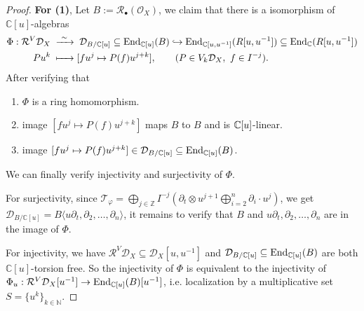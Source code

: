 \begin{proof}
    \mbox{}

    \noindent\textbf{For (1)}, Let $B:=\mathcal{R}_{\bullet}(\mathcal{O}_X)$, we claim that there is a isomorphism of $\mathbb{C}[u]$-algebras
    \begin{align*}
        \Phi: \mathcal{R}^V \mathcal{D}_X \; & \xrightarrow{\ \sim\ }\; \mathcal{D}_{B/\mathbb{C}[u]} \subseteq \End_{\mathbb{C}[u]}(B)  \hookrightarrow \End_{\mathbb{C}[u, u^{-1}]}(R[u, u^{-1}]) \subseteq \End_{\mathbb{C}}(R[u,u^{-1}]) \\
        Pu^k \;                              & \mathrel{\mapstochar\xrightarrow{\phantom{\ \sim\ }}} [fu^j \mapsto P(f)u^{j+k}], \qquad (P\in V_k\mathcal{D}_X,\ f\in I^{-j}).
    \end{align*}
    After verifying that
    \begin{enumerate}
        \item $\Phi$ is a ring homomorphism.
        \item image $[fu^j \mapsto P(f)u^{j+k}]$ maps $B$ to $B$ and is $\mathbb{C}[u]$-linear.
        \item image $[fu^j \mapsto P(f)u^{j+k}] \in \mathcal{D}_{B/\mathbb{C}[u]} \subseteq \operatorname{End}_{\mathbb{C}[u]}(B)$.
    \end{enumerate}
    We can finally verify injectivity and surjectivity of $\Phi$.

    \medskip

    For surjectivity, since $\mathcal{T}_\varphi = \bigoplus\limits_{j \in \mathbb{Z}} I^{-j} (\partial_t \otimes u^{j+1} \bigoplus_{i=2}^n \partial_i \cdot u^j)$, we get $\mathcal{D}_{B/\mathbb{C}[u]} = B\langle u\partial_t, \partial_2, \ldots, \partial_n \rangle$, it remains to verify that $B$ and $u\partial_t, \partial_2, \ldots, \partial_n$ are in the image of $\Phi$.

    \medskip

    For injectivity, we have $\mathcal{R}^V \mathcal{D}_X \subseteq \mathcal{D}_X[u,u^{-1}]$ and $\mathcal{D}_{B/\mathbb{C}[u]} \subseteq \operatorname{End}_{\mathbb{C}[u]}(B)$ are both $\mathbb{C}[u]$-torsion free.
    So the injectivity of $\Phi$ is equivalent to the injectivity of $\Phi_u: \mathcal{R}^V \mathcal{D}_X[u^{-1}] \to \operatorname{End}_{\mathbb{C}[u]}(B)[u^{-1}]$, i.e. localization by a multiplicative set $S = \{u^k\}_{k \in \mathbb{N}}$.


\end{proof}

